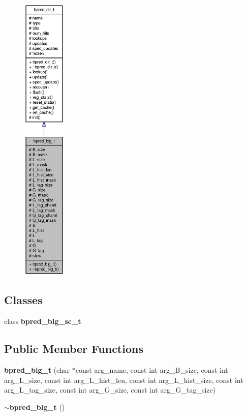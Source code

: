 \begin{figure}[H]
\begin{center}
\leavevmode
\includegraphics[height=400pt]{classbpred__blg__t__coll__graph}
\end{center}
\end{figure}
\subsection*{Classes}
\begin{CompactItemize}
\item 
class {\bf bpred\_\-blg\_\-sc\_\-t}
\end{CompactItemize}
\subsection*{Public Member Functions}
\begin{CompactItemize}
\item 
{\bf bpred\_\-blg\_\-t} (char $\ast$const arg\_\-name, const int arg\_\-B\_\-size, const int arg\_\-L\_\-size, const int arg\_\-L\_\-hist\_\-len, const int arg\_\-L\_\-hist\_\-size, const int arg\_\-L\_\-tag\_\-size, const int arg\_\-G\_\-size, const int arg\_\-G\_\-tag\_\-size)
\item 
{\bf $\sim$bpred\_\-blg\_\-t} ()
\end{CompactItemize}

